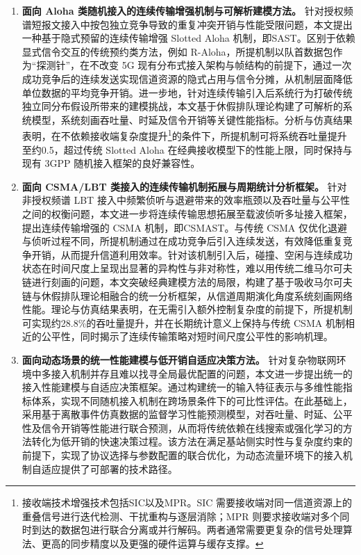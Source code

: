 \begin{enumerate}
	\item 	\textbf{面向 Aloha 类随机接入的连续传输增强机制与可解析建模方法。}
	针对授权频谱短报文接入中按包独立竞争导致的重复冲突开销与性能受限问题，本文提出一种基于隐式预留的连续传输增强 Slotted Aloha 机制，即SAST。区别于依赖显式信令交互的传统预约类方法，例如 R-Aloha，所提机制以队首数据包作为“探测针”，在不改变 5G 现有分布式接入架构与帧结构的前提下，通过一次成功竞争后的连续发送实现信道资源的隐式占用与信令分摊，从机制层面降低单位数据的平均竞争开销。进一步地，针对连续传输引入后系统行为打破传统独立同分布假设所带来的建模挑战，本文基于休假排队理论构建了可解析的系统模型，系统刻画吞吐量、时延及信令开销等关键性能指标。分析与仿真结果表明，在不依赖接收端复杂度提升\footnote{接收端技术增强技术包括SIC以及MPR。SIC 需要接收端对同一信道资源上的重叠信号进行迭代检测、干扰重构与逐层消除；MPR 则要求接收端对多个同时到达的数据包进行联合分离或并行解码。两者通常需要更复杂的信号处理算法、更高的同步精度以及更强的硬件运算与缓存支撑。}的条件下，所提机制可将系统吞吐量提升至约0.5，超过传统 Slotted Aloha 在经典接收模型下的性能上限，同时保持与现有 3GPP 随机接入框架的良好兼容性。


	\item \textbf{面向 CSMA/LBT 类接入的连续传输机制拓展与周期统计分析框架。}
	针对非授权频谱 LBT 接入中频繁侦听与退避带来的效率瓶颈以及吞吐量与公平性之间的权衡问题，本文进一步将连续传输思想拓展至载波侦听多址接入框架，提出连续传输增强的 CSMA 机制，即CSMAST。与传统 CSMA 仅优化退避与侦听过程不同，所提机制通过在成功竞争后引入连续发送，有效降低重复竞争开销，从而提升信道利用效率。针对该机制引入后，碰撞、空闲与连续成功状态在时间尺度上呈现出显著的异构性与非对称性，难以用传统二维马尔可夫链进行刻画的问题，本文突破经典建模方法的局限，构建了基于吸收马尔可夫链与休假排队理论相融合的统一分析框架，从信道周期演化角度系统刻画网络性能。理论与仿真结果表明，在无需引入额外控制复杂度的前提下，所提机制可实现约28.8\%的吞吐量提升，并在长期统计意义上保持与传统 CSMA 机制相近的公平性，同时揭示了连续传输策略对短时间尺度公平性的影响机理。

	\item \textbf{面向动态场景的统一性能建模与低开销自适应决策方法。}
	针对复杂物联网环境中多接入机制并存且难以找寻全局最优配置的问题，本文进一步提出统一的接入性能建模与自适应决策框架。通过构建统一的输入特征表示与多维性能指标体系，实现不同随机接入机制在跨场景条件下的可比性评估。在此基础上，采用基于离散事件仿真数据的监督学习性能预测模型，对吞吐量、时延、公平性及信令开销等性能进行联合预测，从而将传统依赖在线搜索或强化学习的方法转化为低开销的快速决策过程。该方法在满足基站侧实时性与复杂度约束的前提下，实现了协议选择与参数配置的联合优化，为动态流量环境下的接入机制自适应提供了可部署的技术路径。

\end{enumerate}


